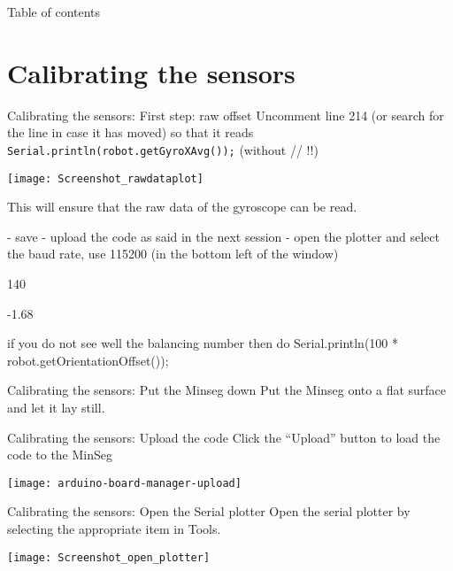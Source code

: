\begin{frame}{Table of contents}
	\tableofcontents
\end{frame}

\section{Calibrating the sensors}
\begin{frame}{Calibrating the sensors: First step: raw offset}
	Uncomment line 214 (or search for the line in case it has moved) so that it reads \texttt{Serial.println(robot.getGyroXAvg());} (without // !!)
	\begin{center}
		\texttt{[image: Screenshot\_rawdataplot]}
	\end{center}
	This will ensure that the raw data of the gyroscope can be read.
\end{frame}

- save
- upload the code as said in the next session
- open the plotter and select the baud rate, use 115200 (in the bottom left of the window)


140


-1.68

if you do not see well the balancing number then do 
  Serial.println(100 * robot.getOrientationOffset());


\begin{frame}{Calibrating the sensors: Put the Minseg down}
	Put the Minseg onto a flat surface and let it lay still.
\end{frame}

\begin{frame}{Calibrating the sensors: Upload the code}
	Click the ``Upload'' button to load the code to the MinSeg
	\begin{center}
		\texttt{[image: arduino-board-manager-upload]}
	\end{center}
\end{frame}

\begin{frame}{Calibrating the sensors: Open the Serial plotter}
	Open the serial plotter by selecting the appropriate item in Tools.
	\begin{center}
		\texttt{[image: Screenshot\_open\_plotter]}
	\end{center}
\end{frame}

